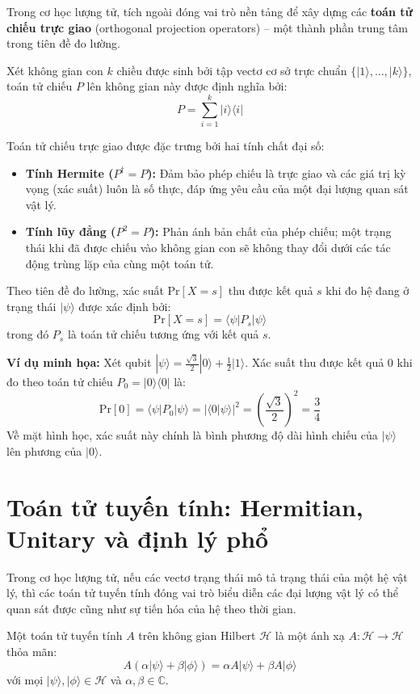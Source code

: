 Trong cơ học lượng tử, tích ngoài đóng vai trò nền tảng để xây dựng các \textbf{toán tử chiếu trực giao} (orthogonal projection operators) -- một thành phần trung tâm trong tiên đề đo lường.
\begin{definition} Xét không gian con $k$ chiều được sinh bởi tập vectơ cơ sở trực chuẩn $\{|1\rangle, \dots, |k\rangle\}$, toán tử chiếu $P$ lên không gian này được định nghĩa bởi:
\[
P = \sum_{i=1}^k |i\rangle\langle i|
\]
\end{definition}

\begin{proposition} Toán tử chiếu trực giao được đặc trưng bởi hai tính chất đại số:
\begin{itemize}
    \item \textbf{Tính Hermite ($P^\dagger = P$):} Đảm bảo phép chiếu là trực giao và các giá trị kỳ vọng (xác suất) luôn là số thực, đáp ứng yêu cầu của một đại lượng quan sát vật lý.
    \item \textbf{Tính lũy đẳng ($P^2 = P$):} Phản ánh bản chất của phép chiếu; một trạng thái khi đã được chiếu vào không gian con sẽ không thay đổi dưới các tác động trùng lặp của cùng một toán tử.
\end{itemize}
Theo tiên đề đo lường, xác suất $\text{Pr}[X = s]$ thu được kết quả $s$ khi đo hệ đang ở trạng thái $|\psi\rangle$ được xác định bởi:
\[
\text{Pr}[X = s] = \langle\psi| P_s |\psi\rangle
\]
trong đó $P_s$ là toán tử chiếu tương ứng với kết quả $s$.
\end{proposition}

\begin{framed} \textbf{Ví dụ minh họa:} Xét qubit $|\psi\rangle = \frac{\sqrt{3}}{2}|0\rangle + \frac{1}{2}|1\rangle$. Xác suất thu được kết quả $0$ khi đo theo toán tử chiếu $P_0 = |0\rangle\langle 0|$ là:$$ \text{Pr}[0] = \langle\psi| P_0 |\psi\rangle = |\langle 0|\psi\rangle|^2 = \left(\frac{\sqrt{3}}{2}\right)^2 = \frac{3}{4} $$Về mặt hình học, xác suất này chính là bình phương độ dài hình chiếu của $|\psi\rangle$ lên phương của $|0\rangle$.
\end{framed}

\section{Toán tử tuyến tính: Hermitian, Unitary và định lý phổ}
\label{sec:operators}
Trong cơ học lượng tử, nếu các vectơ trạng thái mô tả trạng thái của một hệ vật lý, thì các toán tử tuyến tính đóng vai trò biểu diễn các đại lượng vật lý có thể quan sát được cũng như sự tiến hóa của hệ theo thời gian.
\begin{definition}
Một toán tử tuyến tính $A$ trên không gian Hilbert $\mathcal{H}$ là một ánh xạ $A: \mathcal{H} \to \mathcal{H}$ thỏa mãn:
$$ A(\alpha |\psi\rangle + \beta |\phi\rangle) = \alpha A|\psi\rangle + \beta A|\phi\rangle $$
với mọi $|\psi\rangle, |\phi\rangle \in \mathcal{H}$ và $\alpha, \beta \in \mathbb{C}$.
\end{definition}

